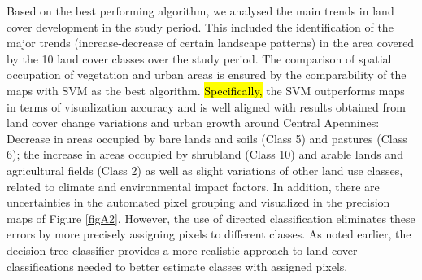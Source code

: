 \documentclass[jimaging,article,submit,pdftex,moreauthors]{Definitions/mdpi}
\begin{document}
Based on the best performing algorithm, we analysed the main trends in land cover development in the study period. This included the identification of the major trends (increase-decrease of certain landscape patterns) in the area covered by the 10 land cover classes over the study period. The comparison of spatial occupation of vegetation and urban areas is ensured by the comparability of the maps with SVM as the best algorithm. \hl{Specifically, }the SVM outperforms maps in terms of visualization accuracy and is well aligned with results obtained from land cover change variations and urban growth around Central Apennines: Decrease in areas occupied by bare lands and soils (Class 5) and pastures (Class 6); the increase in areas occupied by shrubland (Class 10) and arable lands and agricultural fields (Class 2) as well as slight variations of other land use classes, related to climate and environmental impact factors. In addition, there are uncertainties in the automated pixel grouping\hl{ }and visualized in the precision maps of Figure \ref{figA2}. However, the use of directed classification eliminates these errors by more precisely assigning pixels to different classes. As noted earlier, the decision tree classifier\hl{ }provides a more realistic approach to land cover classifications needed to better estimate classes with assigned pixels.
\end{document}
